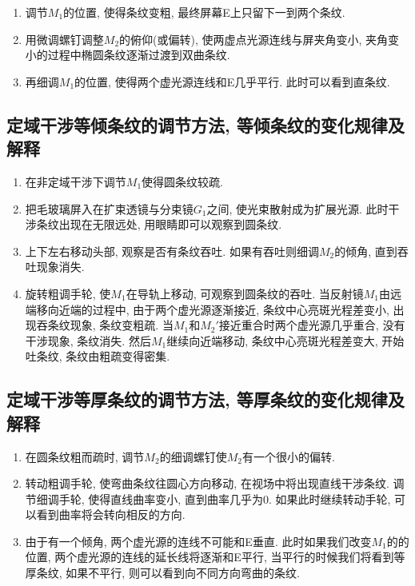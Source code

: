 \documentclass[a4paper,10pt,notitlepage]{article}
\begin{document}
\begin{enumerate}
	\item 调节$M_1$的位置, 使得条纹变粗, 最终屏幕E上只留下一到两个条纹.
	\item 用微调螺钉调整$M_2$的俯仰(或偏转), 使两虚点光源连线与屏夹角变小, 夹角变小的过程中椭圆条纹逐渐过渡到双曲条纹. 
	\item 再细调$M_1$的位置, 使得两个虚光源连线和E几乎平行. 此时可以看到直条纹.
\end{enumerate}

\subsection{定域干涉等倾条纹的调节方法, 等倾条纹的变化规律及解释}

\begin{enumerate}
	\item 在非定域干涉下调节$M_1$使得圆条纹较疏. 
	\item 把毛玻璃屏入在扩束透镜与分束镜$G_1$之间, 使光束散射成为扩展光源. 此时干涉条纹出现在无限远处, 用眼睛即可以观察到圆条纹.
	\item 上下左右移动头部, 观察是否有条纹吞吐. 如果有吞吐则细调$M_2$的倾角, 直到吞吐现象消失.
	\item 旋转粗调手轮, 使$M_1$在导轨上移动, 可观察到圆条纹的吞吐. 当反射镜$M_1$由远端移向近端的过程中, 由于两个虚光源逐渐接近, 条纹中心亮斑光程差变小, 出现吞条纹现象, 条纹变粗疏. 当$M_1$和$M_2'$接近重合时两个虚光源几乎重合, 没有干涉现象, 条纹消失. 然后$M_1$继续向近端移动, 条纹中心亮斑光程差变大, 开始吐条纹, 条纹由粗疏变得密集. 
\end{enumerate}

\subsection{定域干涉等厚条纹的调节方法, 等厚条纹的变化规律及解释}

\begin{enumerate}
	\item 在圆条纹粗而疏时, 调节$M_2$的细调螺钉使$M_2$有一个很小的偏转.
	\item 转动粗调手轮, 使弯曲条纹往圆心方向移动, 在视场中将出现直线干涉条纹. 调节细调手轮, 使得直线曲率变小, 直到曲率几乎为0. 如果此时继续转动手轮, 可以看到曲率将会转向相反的方向. 
	\item 由于有一个倾角, 两个虚光源的连线不可能和E垂直. 此时如果我们改变$M_1$的的位置, 两个虚光源的连线的延长线将逐渐和E平行, 当平行的时候我们将看到等厚条纹, 如果不平行, 则可以看到向不同方向弯曲的条纹.
\end{enumerate}
\end{document}
